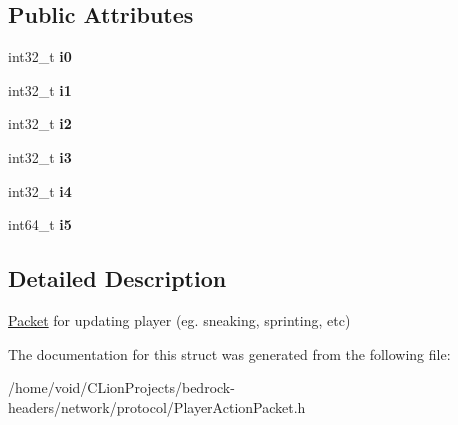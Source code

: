 \subsection*{Public Attributes}
\begin{DoxyCompactItemize}
\item 
\mbox{\label{struct_player_action_packet_af5c61d08dede81b400fc500dc21e8c73}} 
int32\+\_\+t {\bfseries i0}
\item 
\mbox{\label{struct_player_action_packet_a80c32256c7d175c90337d01ec2e0edb5}} 
int32\+\_\+t {\bfseries i1}
\item 
\mbox{\label{struct_player_action_packet_abb80e4a63a8b6ef50932c57e298015ec}} 
int32\+\_\+t {\bfseries i2}
\item 
\mbox{\label{struct_player_action_packet_afa96047a21a4e0d41c340e04029a970e}} 
int32\+\_\+t {\bfseries i3}
\item 
\mbox{\label{struct_player_action_packet_a257e2a2d275da1b386c95ba63276c6d7}} 
int32\+\_\+t {\bfseries i4}
\item 
\mbox{\label{struct_player_action_packet_aabe30f72e45e7f3577a16db2b704bc4e}} 
int64\+\_\+t {\bfseries i5}
\end{DoxyCompactItemize}


\subsection{Detailed Description}
\mbox{\hyperlink{struct_packet}{Packet}} for updating player (eg. sneaking, sprinting, etc) 

The documentation for this struct was generated from the following file\+:\begin{DoxyCompactItemize}
\item 
/home/void/\+C\+Lion\+Projects/bedrock-\/headers/network/protocol/Player\+Action\+Packet.\+h\end{DoxyCompactItemize}
